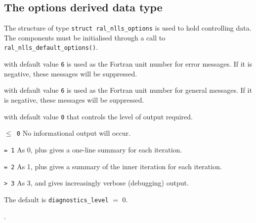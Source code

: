 \documentclass{spec}
\begin{document}
\subsection{The options derived data type}
\label{typeoptions}

The structure of type {\tt struct ral\_nlls\_options} is used to hold
controlling data. The components must be initialised through a call to
\texttt{ral\_nlls\_default\_options()}.

\vspace{2mm}

\begin{description}

 with default value {\tt 6}
is used as the Fortran unit number for error messages. If it is negative, these
messages will be suppressed.

 with default value {\tt 6}
is used as the Fortran unit number for general messages. If it is negative, these messages will be suppressed.

 with default value {\tt 0} that
controls the level of output required.
\begin{description}
\item{\tt $\leq$ 0} No informational output will occur.
\item{\tt = 1} As 0, plus gives a one-line summary for each iteration.
\item{\tt = 2} As 1, plus gives a summary of the inner iteration for each iteration.
\item{\tt > 3} As 3, and gives increasingly verbose (debugging) output.
\end{description}
The default is {\tt diagnostics\_level} $=$ 0.
\end{description}

.
\end{document}

